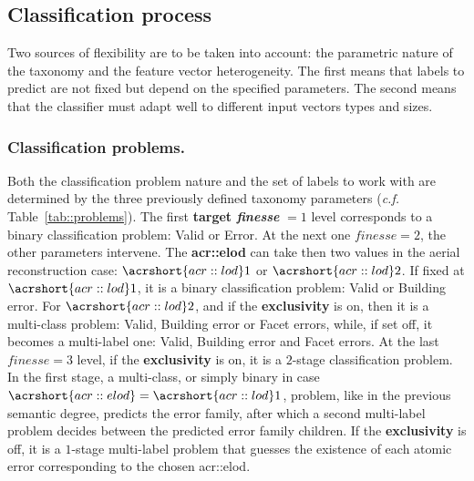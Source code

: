 \documentclass[runningheads]{llncs}
\begin{document}
\subsection{Classification process}

Two sources of flexibility are to be taken into account: the parametric nature of the taxonomy and the feature vector heterogeneity. The first means that labels to predict are not fixed but depend on the specified parameters. The second means that the classifier must adapt well to different input vectors types and sizes.

\subsubsection{Classification problems.}
Both the classification problem nature and the set of labels to work with are determined by the three previously defined taxonomy parameters (\textit{c.f.} Table~\ref{tab::problems}). The first \textbf{target \textit{finesse}} $= 1$ level corresponds to a binary classification problem: Valid or Error. At the next one $\textit{finesse}=2$, the other parameters intervene. The \textbf{\acrshort{acr::elod}} can take then two values in the aerial reconstruction case: $\acrshort{acr::lod}1$ or $\acrshort{acr::lod}2$. If fixed at $\acrshort{acr::lod}1$, it is a binary classification problem: Valid or Building error. For $\acrshort{acr::lod}2$, and if the \textbf{exclusivity} is on, then it is a multi-class problem: Valid, Building error or Facet errors, while, if set off, it becomes a multi-label one: Valid, Building error and Facet errors. At the last $\textit{finesse}=3$ level, if the \textbf{exclusivity} is on, it is a $2$-stage classification problem. In the first stage, a multi-class, or simply binary in case $\acrshort{acr::elod} = \acrshort{acr::lod}1$, problem, like in the previous semantic degree, predicts the error family, after which a second multi-label problem decides between the predicted error family children. If the \textbf{exclusivity} is off, it is a $1$-stage multi-label problem that guesses the existence of each atomic error corresponding to the chosen \acrshort{acr::elod}.
\end{document}
